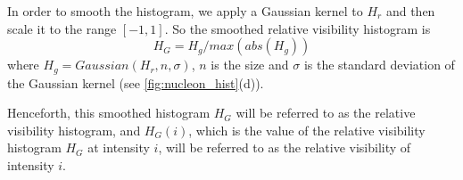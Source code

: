 \documentclass[twoside,twocolumn,10pt]{article}
\begin{document}

In order to smooth the histogram, we apply a Gaussian kernel to $ H_{r} $ and then scale it to the range $ [-1,1] $.
So the smoothed relative visibility histogram is
\[ H_{G}= H_{g}/max(abs(H_{g})) \]
where $ H_{g}=Gaussian(H_{r},n,\sigma)$, $ n $ is the size and $ \sigma $ is the standard deviation of the Gaussian kernel (see \autoref{fig:nucleon_hist}(d)).

Henceforth, this smoothed histogram $ H_{G} $ will be referred to as the relative visibility histogram, and $ H_{G}(i) $, which is the value of the relative visibility histogram $ H_{G} $ at intensity $ i $, will be referred to as the relative visibility of intensity $ i$.





\end{document}
